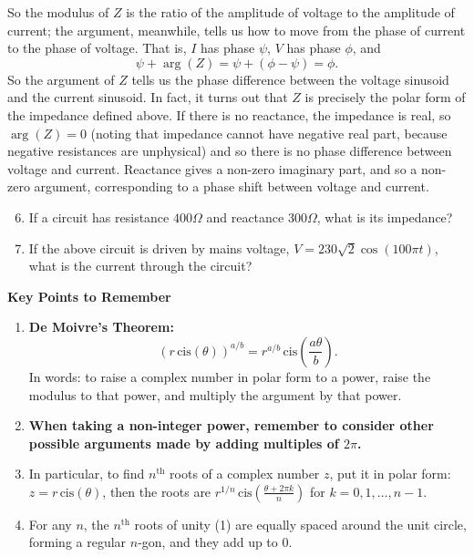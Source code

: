 \documentclass{article}
\newcommand{\cis}{\,\mathrm{cis}}
\begin{document}
So the modulus of $Z$ is the ratio of the amplitude of voltage to the amplitude of current; the argument, meanwhile, tells us how to move from the phase of current to the phase of voltage. That is, $I$ has phase $\psi$, $V$ has phase $\phi$, and
\[\psi+\arg(Z)=\psi+(\phi-\psi)=\phi.\]
So the argument of $Z$ tells us the phase difference between the voltage sinusoid and the current sinusoid. In fact, it turns out that $Z$ is precisely the polar form of the impedance defined above. If there is no reactance, the impedance is real, so $\arg(Z)=0$ (noting that impedance cannot have negative real part, because negative resistances are unphysical) and so there is no phase difference between voltage and current. Reactance gives a non-zero imaginary part, and so a non-zero argument, corresponding to a phase shift between voltage and current.\smallskip

\begin{enumerate}
\setcounter{enumi}{5}
\item If a circuit has resistance $400\Omega$ and reactance $300\Omega$, what is its impedance?
\item If the above circuit is driven by mains voltage, $V=230\sqrt{2}\cos(100\pi t)$, what is the current through the circuit?
\end{enumerate}








\clearpage



\textbf{Key Points to Remember}

\vspace{5mm}

\begin{enumerate}
\item \textbf{De Moivre's Theorem:}
	\[\left(r\cis(\theta)\right)^{a/b} = r^{a/b}\cis\left(\frac{a\theta}{b}\right).\]
	In words: to raise a complex number in polar form to a power, raise the modulus to that power, and multiply the argument by that power.
\item \textbf{When taking a non-integer power, remember to consider other possible arguments made by adding multiples of $2\pi$.}
\item In particular, to find $n^{\mathrm{th}}$ roots of a complex number $z$, put it in polar form: $z=r\cis(\theta)$, then the roots are $r^{1/n}\cis\left(\frac{\theta+2\pi k}{n}\right)$ for $k=0, 1, \hdots, n-1$.
\item For any $n$, the $n^{\mathrm{th}}$ roots of unity (1) are equally spaced around the unit circle, forming a regular $n$-gon, and they add up to 0.
\end{enumerate}
\end{document}
